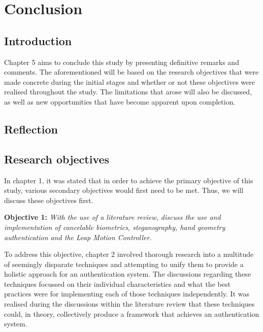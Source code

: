 \chapter{Conclusion}


\section{Introduction}

Chapter 5 aims to conclude this study by presenting definitive remarks and comments. The aforementioned will be based on the research objectives that were made concrete during the initial stages and whether or not these objectives were realised throughout the study. The limitations that arose will also be discussed, as well as new opportunities that have become apparent upon completion.

\section{Reflection}


\section{Research objectives}

In chapter 1, it was stated that in order to achieve the primary objective of this study, various secondary objectives would first need to be met. Thus, we will discuss these objectives first.


\textbf{Objective 1:} \textit{With the use of a literature review, discuss the use and implementation of cancelable biometrics, steganography, hand geometry authentication and the Leap Motion Controller.}


To address this objective, chapter 2 involved thorough research into a multitude of seemingly disparate techniques and attempting to unify them to provide a holistic approach for an authentication system. The discussions regarding these techniques focussed on their individual characteristics and what the best practices were for implementing each of those techniques independently. It was realised during the discussions within the literature review that these techniques could, in theory, collectively produce a framework that achieves an authentication system.


